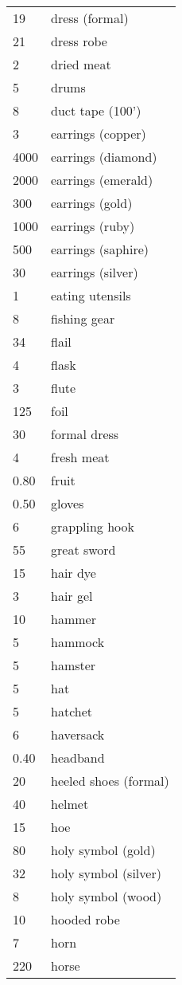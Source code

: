 \begin{normbox}[Equipment]
\begin{tabularx}{\linewidth}{@{} l X }
19 & dress (formal)\\
21 & dress robe\\
2 & dried meat\\
5 & drums\\
8 & duct tape (100')\\
3 & earrings (copper)\\
4000 & earrings (diamond)\\
2000 & earrings (emerald)\\
300 & earrings (gold)\\
1000 & earrings (ruby)\\
500 & earrings (saphire)\\
30 & earrings (silver)\\
1 & eating utensils\\
8 & fishing gear\\
34 & flail\\
4 & flask\\
3 & flute\\
125 & foil\\
30 & formal dress\\
4 & fresh meat\\
0.80 & fruit\\
0.50 & gloves\\
6 & grappling hook\\
55 & great sword\\
15 & hair dye\\
3 & hair gel\\
10 & hammer\\
5 & hammock\\
5 & hamster\\
5 & hat\\
5 & hatchet\\
6 & haversack\\
0.40 & headband\\
20 & heeled shoes (formal)\\
40 & helmet\\
15 & hoe\\
80 & holy symbol (gold)\\
32 & holy symbol (silver)\\
8 & holy symbol (wood)\\
10 & hooded robe\\
7 & horn\\
220 & horse\\

\end{tabularx}
\end{normbox}
